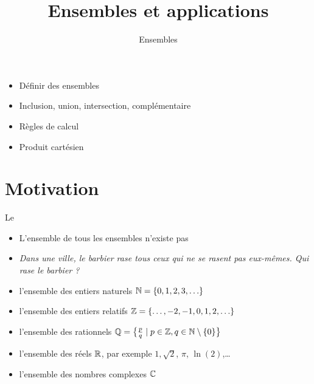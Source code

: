 







\title{{\bf Ensembles et applications}}
\subtitle{Ensembles}

\begin{frame}
  
  \debutmontitre

  \pause

{\footnotesize
\hfill
{}
\begin{minipage}{0.6\textwidth}
  \begin{itemize}
    \item<3-> Définir des ensembles
    \item<4-> Inclusion, union, intersection, complémentaire
    \item<5-> Règles de calcul
    \item<6-> Produit cartésien
  \end{itemize}
\end{minipage}
}

\end{frame}

\setcounter{framenumber}{0}


\section{Motivation}

\begin{frame}

Le  \pause 

\begin{itemize}
  \item L'ensemble de tous les ensembles n'existe pas

\pause

  \item \emph{\og Dans une ville, le barbier rase tous ceux qui ne se rasent pas eux-mêmes.
Qui rase le barbier ? \fg\ }
\end{itemize}


\bigskip
\pause

\begin{itemize}
  \item l'ensemble des entiers naturels $\mathbb{N} =\{0,1,2,3,\ldots\}$
\pause
  \item l'ensemble des entiers relatifs $\mathbb{Z} = \{\ldots, -2,-1,0,1,2,\ldots\}$
\pause
  \item l'ensemble des rationnels $\mathbb{Q} = \big\{ \frac{p}{q} \mid p \in \mathbb{Z}, q \in \mathbb{N}\setminus \{ 0\} \big\}$
\pause
  \item l'ensemble des réels $\mathbb{R}$, par exemple $1, \sqrt 2$, $\pi$, $\ln(2)$,\ldots
\pause
  \item l'ensemble des nombres complexes $\mathbb{C}$
\end{itemize}

\end{frame}


